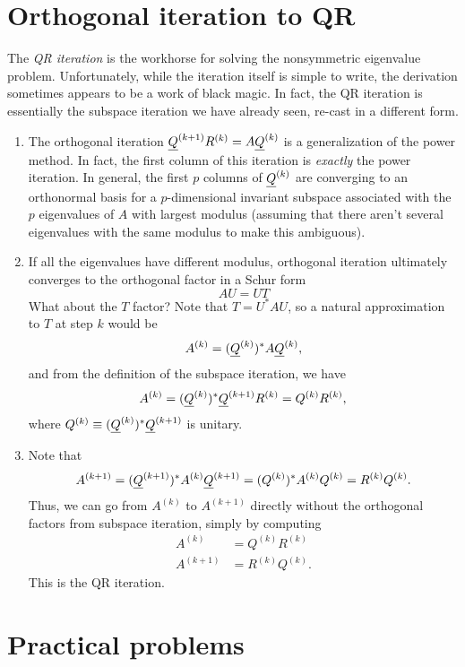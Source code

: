 \documentclass[12pt, leqno]{article}
\begin{document}

\section{Orthogonal iteration to QR}

The {\em QR iteration} is the workhorse for solving the nonsymmetric
eigenvalue problem.  Unfortunately, while the iteration itself is
simple to write, the derivation sometimes appears to be a work of
black magic.  In fact, the QR iteration is essentially the subspace
iteration we have already seen, re-cast in a different form.

\begin{enumerate}
\item
  The orthogonal iteration $\underline{Q}^{(k+1)} R^{(k)} = A \underline{Q}^{(k)}$ is a
  generalization of the power method.  In fact, the first column of
  this iteration is {\em exactly} the power iteration.  In general,
  the first $p$ columns of $\underline{Q}^{(k)}$ are converging to an orthonormal
  basis for a $p$-dimensional invariant subspace associated with the
  $p$ eigenvalues of $A$ with largest modulus (assuming that there
  aren't several eigenvalues with the same modulus to make this
  ambiguous).
\item
  If all the eigenvalues have different modulus, orthogonal iteration
  ultimately converges to the orthogonal factor in a Schur form
  \[
    AU = UT
  \]
  What about the $T$ factor?  Note that $T = U^* A U$, so a natural
  approximation to $T$ at step $k$ would be
  \[
    A^{(k)} = (\underline{Q}^{(k)})^* A \underline{Q}^{(k)},
  \]
  and from the definition of the subspace iteration, we have
  \[
    A^{(k)} = (\underline{Q}^{(k)})^* \underline{Q}^{(k+1)} R^{(k)} = Q^{(k)} R^{(k)},
  \]
  where $Q^{(k)} \equiv (\underline{Q}^{(k)})^* \underline{Q}^{(k+1)}$ is unitary.
\item
  Note that
  \[
    A^{(k+1)}
    = (\underline{Q}^{(k+1)})^* A^{(k)} \underline{Q}^{(k+1)}
    = (Q^{(k)})^* A^{(k)} Q^{(k)}
    = R^{(k)} Q^{(k)}.
  \]
  Thus, we can go from $A^{(k)}$ to $A^{(k+1)}$ directly without
  the orthogonal factors from subspace iteration, simply by computing
  \begin{align*}
    A^{(k)} &= Q^{(k)} R^{(k)} \\
    A^{(k+1)} &= R^{(k)} Q^{(k)}.
  \end{align*}
  This is the QR iteration.
\end{enumerate}

\section{Practical problems}
\end{document}
